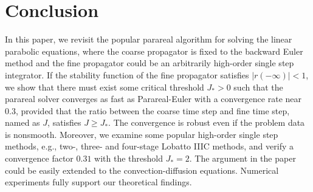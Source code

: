
\section{Conclusion}
In this paper, we revisit the popular parareal algorithm for solving the linear parabolic equations, where the coarse propagator is fixed to the backward Euler method
and the fine propagator could be an arbitrarily high-order
single step integrator.
If the stability function of the fine propagator satisfies $|r(-\infty)|<1$,
we show that there must exist some critical threshold $J_*>0$ such
that the parareal solver converges as fast as Parareal-Euler with a convergence rate near $0.3$,
provided that the ratio between the coarse time step and fine
time step, named as $J$, satisfies $J \ge J_*$.
The convergence is robust even if the problem data is nonsmooth.  Moreover, we examine some popular high-order single step methods, e.g., two-, three- and four-stage Lobatto IIIC methods,
and verify a convergence factor
$0.31$ with the threshold $J_* = 2$.
The argument in the paper could be easily extended to the convection-diffusion equations.
Numerical experiments fully support our theoretical findings.


